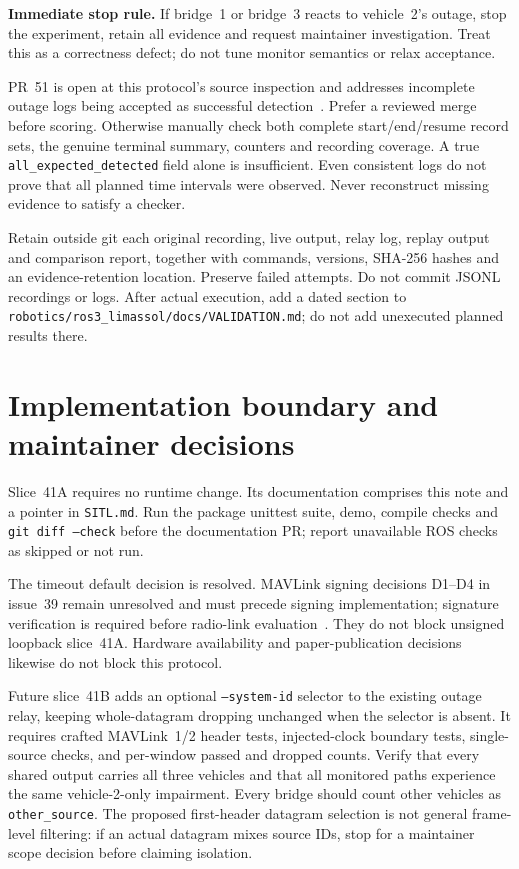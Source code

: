 \documentclass[10pt,a4paper]{article}
\begin{document}
\textbf{Immediate stop rule.} If bridge~1 or bridge~3 reacts to vehicle~2's
outage, stop the experiment, retain all evidence and request maintainer
investigation. Treat this as a correctness defect; do not tune monitor
semantics or relax acceptance.

\newpage
PR~51 is open at this protocol's source inspection and addresses incomplete
outage logs being accepted as successful detection~\cite{pr51}. Prefer a
reviewed merge before scoring. Otherwise manually check both complete
start/end/resume record sets, the genuine terminal summary, counters and
recording coverage. A true \texttt{all\_expected\_detected} field alone is
insufficient. Even consistent logs do not prove that all planned time
intervals were observed. Never reconstruct missing evidence to satisfy a
checker.

Retain outside git each original recording, live output, relay log, replay
output and comparison report, together with commands, versions, SHA-256
hashes and an evidence-retention location. Preserve failed attempts.
Do not commit JSONL recordings or logs. After actual execution, add a dated
section to \texttt{robotics/ros3\_limassol/docs/VALIDATION.md}; do not add
unexecuted planned results there.

\section{Implementation boundary and maintainer decisions}
Slice~41A requires no runtime change. Its documentation comprises this note
and a pointer in \texttt{SITL.md}. Run the package unittest suite, demo,
compile checks and \texttt{git diff --check} before the documentation PR;
report unavailable ROS checks as skipped or not run.

The timeout default decision is resolved. MAVLink signing decisions D1--D4
in issue~39 remain unresolved and must precede signing implementation;
signature verification is required before radio-link evaluation~\cite{issue39}.
They do not block unsigned loopback slice~41A. Hardware availability and
paper-publication decisions likewise do not block this protocol.

Future slice~41B adds an optional \texttt{--system-id} selector to the
existing outage relay, keeping whole-datagram dropping unchanged when the
selector is absent. It requires crafted MAVLink~1/2 header tests,
injected-clock boundary tests, single-source checks, and per-window passed
and dropped counts. Verify that every shared output carries all three
vehicles and that all monitored paths experience the same vehicle-2-only
impairment. Every bridge should count other vehicles as
\texttt{other\_source}. The proposed first-header datagram selection is not
general frame-level filtering: if an actual datagram mixes source IDs,
stop for a maintainer scope decision before claiming isolation.
\end{document}
